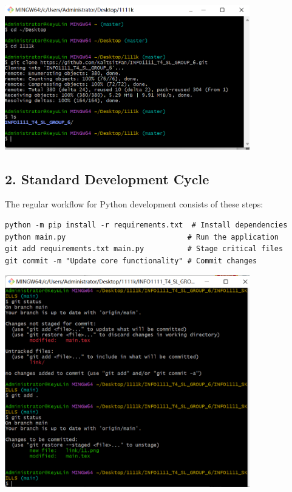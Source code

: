 \documentclass[a4paper, 11pt]{report}
\begin{document}
\begin{center}
\includegraphics[width=0.8\textwidth]{link/11.png}
\end{center}

\subsection*{2. Standard Development Cycle}
The regular workflow for Python development consists of these steps:
\begin{verbatim}
python -m pip install -r requirements.txt  # Install dependencies
python main.py                            # Run the application
git add requirements.txt main.py          # Stage critical files
git commit -m "Update core functionality" # Commit changes
\end{verbatim}

\begin{center}
\includegraphics[width=0.8\textwidth]{link/22.png}
\end{center}
\end{document}
